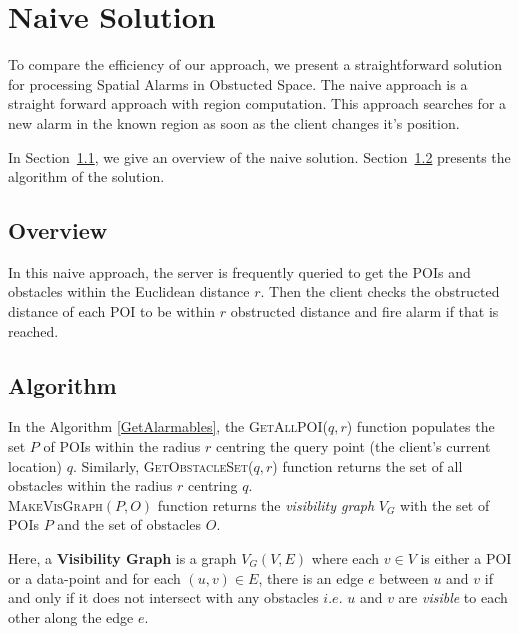 \chapter{Naive Solution}
\label{chap:naivesoln}

To compare the efficiency of our approach, we present a straightforward solution for processing Spatial Alarms in Obstucted Space. The naive approach is a straight forward approach with region computation.  This approach searches for a new alarm in the known region as soon as the client changes it's position.


In Section~\ref{naiveview}, we give an overview of the naive solution. Section~\ref{naivealgo} presents the algorithm of the solution.

\vspace*{12pt}

\section{Overview}
\label{naiveview}
In this naive approach, the server is frequently queried to get the POIs and obstacles within the Euclidean distance $r$. Then the client checks the obstructed distance of each POI to be within $r$ obstructed distance and fire alarm if that is reached.\\


\vspace*{12pt}

\section{Algorithm}
\label{naivealgo}

In the Algorithm \ref{GetAlarmables}, the \textsc{GetAllPOI}($q, r$) function populates the set $P$ of POIs within the radius $r$ centring the query point (the client's current location) $q$. Similarly, \textsc{GetObstacleSet}($q, r$) function returns the set of all obstacles within the radius $r$ centring $q$.\\

\textsc{MakeVisGraph}$(P,O)$ function returns the \textit{visibility graph} $V_G$ with the set of POIs $P$ and the set of obstacles $O$.

Here, a \textbf{Visibility Graph} is a graph $V_G(V,E)$ where each $v \in V$ is either a POI or a data-point and for each $(u,v) \in E$, there is an edge $e$ between $u$ and $v$ if and only if it does not intersect with any obstacles $i.e.$ $u$ and $v$ are \textit{visible} to each other along the edge $e$.\\

